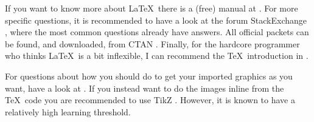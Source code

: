 If you want to know more about \LaTeX\ there is a (free) manual at \cite{cite:NotShort}. For more specific questions, it is recommended to have a look at the forum StackExchange \cite{cite:TeX.SX}, where the most common questions already have answers. All official packets can be found, and downloaded, from CTAN \cite{cite:CTAN}. Finally, for the hardcore programmer who thinks \LaTeX\ is a bit inflexible, I can recommend the \TeX\ introduction in \cite{cite:TeXimpatient}.

For questions about how you should do to get your imported graphics as you want, have a look at \cite{cite:ImportedGraphics}. If you instead want to do the images inline from the \TeX\ code you are recommended to use TikZ \cite{cite:TikZ}. However, it is known to have a relatively high learning threshold.
